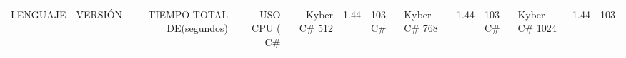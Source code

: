 \begin{tabular}{llrrr}
\toprule
LENGUAJE &       VERSIÓN & TIEMPO TOTAL DE (segundos) & USO CPU (%
\midrule
      C# &  Kyber C# 512 &                                  1.44 &        103%
      C# &  Kyber C# 768 &                                  1.44 &        103%
      C# & Kyber C# 1024 &                                  1.44 &        103%
\bottomrule
\end{tabular}
